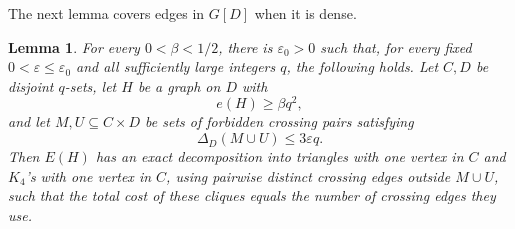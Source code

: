 \documentclass[11pt]{article}
\numberwithin{equation}{section}
\newtheorem{lemma}[theorem]{Lemma}
\theoremstyle{remark}
\newcommand{\e}{\varepsilon}
\begin{document}
The next lemma covers edges in \(G[D]\) when it is dense.

\begin{lemma}
  \label{dec:lem:dense-completion}
For every \(0<\beta<1/2\),
there is \(\e_0>0\) such that, for every fixed
\(0<\e\le\e_0\) and all sufficiently large
integers \(q\), the following holds.
Let \(C,D\) be disjoint \(q\)-sets, let \(H\) be a graph on \(D\) with
\begin{equation}\label{dec:eq:3.5}
  e(H)\ge\beta q^2,
\end{equation}
and let \(M,U\subseteq C\times D\) be sets of forbidden crossing pairs satisfying
\begin{equation*}
  \Delta_D(M\cup U)\le3\e q.
\end{equation*}
Then \(E(H)\) has an exact decomposition into triangles with one vertex
in \(C\) and \(K_4\)'s with one vertex in \(C\), using pairwise distinct
crossing edges outside \(M\cup U\), such that the total cost of these cliques equals
the number of crossing edges they use.
\end{lemma}
\end{document}
